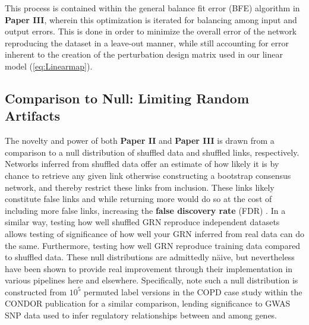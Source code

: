 This process is contained within the general balance fit error (BFE) algorithm in \textbf{Paper III}, wherein this optimization is iterated for balancing among input and output errors. This is done in order to minimize the overall error of the network reproducing the dataset in a leave-out manner, while still accounting for error inherent to the creation of the perturbation design matrix used in our linear model (\cref{eq:Linearmap}).

\subsection{Comparison to Null: Limiting Random Artifacts}
\label{sec:null}
The novelty and power of both \textbf{Paper II} and \textbf{Paper III} is drawn from a comparison to a null distribution of shuffled data and shuffled links, respectively. Networks inferred from shuffled data offer an estimate of how likely it is by chance to retrieve any given link otherwise constructing a bootstrap consensus network, and thereby restrict these links from inclusion. These links likely constitute false links and while returning more would do so at the cost of including more false links, increasing the \textbf{false discovery rate} (FDR) \citep{kall2007posterior}. In a similar way, testing how well shuffled GRN reproduce independent datasets allows testing of significance of how well your GRN inferred from real data can do the same. Furthermore, testing how well GRN reproduce training data compared to shuffled data. These null distributions are admittedly n{\"a}ive, but nevertheless have been shown to provide real improvement through their implementation in various pipelines here and elsewhere. Specifically, note such a null distribution is constructed from $10^5$ permuted label versions \cite{platig2016bipartite} in the COPD case study within the CONDOR publication for a similar comparison, lending significance to GWAS SNP data used to infer regulatory relationships between and among genes.